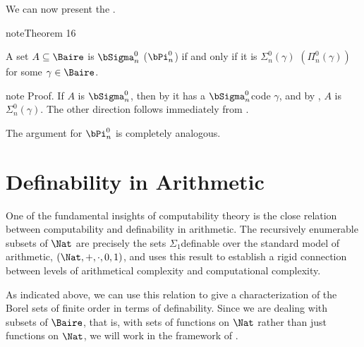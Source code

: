 \documentclass[letterpaper,10pt,english]{jupyterBook}
\begin{document}
\sphinxAtStartPar
We can now present the .
\label{codingBorel:thm-fundamental}
\begin{sphinxadmonition}{note}{Theorem 16}



\sphinxAtStartPar
A set \(A \subseteq \Baire\) is \(\bSigma^0_n\) (\(\bPi^0_n\)) if and only if it is \(\Sigma^0_n(\gamma)\) \((\Pi^0_n(\gamma))\) for some \(\gamma \in \Baire\).
\end{sphinxadmonition}

\begin{sphinxadmonition}{note}
\sphinxAtStartPar
Proof. If \(A\) is \(\bSigma^0_n\), then by {\hyperref[\detokenize{codingBorel:prop-Borel-codes}]{}} it has a \(\bSigma^0_n\)\sphinxhyphen{}code \(\gamma\), and by {\hyperref[\detokenize{codingBorel:prop-relative-codes}]{}}, \(A\) is \(\Sigma^0_n(\gamma)\). The other direction follows immediately from {\hyperref[\detokenize{codingBorel:prop-relative-codes}]{}}.

\sphinxAtStartPar
The argument for \(\bPi^0_n\) is completely analogous.
\end{sphinxadmonition}


\section{Definability in Arithmetic}
\label{\detokenize{codingBorel:definability-in-arithmetic}}
\sphinxAtStartPar
One of the fundamental insights of computability theory is the close relation between computability and definability in arithmetic. The recursively enumerable subsets of \(\Nat\) are precisely the sets \(\Sigma_1\)\sphinxhyphen{}definable over the standard model of arithmetic, \((\Nat,+,\cdot,0,1)\), and  uses this result to establish a rigid connection between levels of arithmetical complexity and computational complexity.

\sphinxAtStartPar
As indicated above, we can use this relation to give a characterization of the Borel sets of finite order in terms of definability. Since we are dealing with subsets of \(\Baire\), that is, with sets of functions on \(\Nat\) rather than just functions on \(\Nat\), we will work in the framework of .
\end{document}
